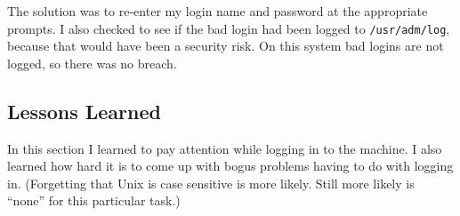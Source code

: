 \documentclass[11pt]{article}
\begin{document}
  The solution was to re-enter my login name and password at the
  appropriate prompts.  I also checked to see if the bad login
  had been logged to {\tt /usr/adm/log}, because that would have
  been a security risk.  On this system bad logins are not logged,
  so there was no breach.

\subsection{Lessons Learned}

  In this section I learned to pay attention while logging in to
the machine.  I also learned how hard it is to come up with bogus
problems having to do with logging in.  (Forgetting that {\sc Unix} is
case sensitive is more likely.  Still more likely is ``none'' for
this particular task.)
\end{document}
